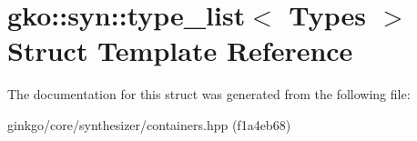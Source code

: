 \hypertarget{structgko_1_1syn_1_1type__list}{}\section{gko\+:\+:syn\+:\+:type\+\_\+list$<$ Types $>$ Struct Template Reference}
\label{structgko_1_1syn_1_1type__list}


The documentation for this struct was generated from the following file\+:\begin{DoxyCompactItemize}
\item 
ginkgo/core/synthesizer/containers.\+hpp (f1a4eb68)\end{DoxyCompactItemize}

